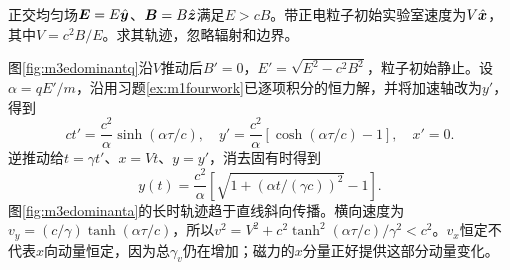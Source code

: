 \begin{exercise}\label{ex:m3electricdominant}
正交均匀场$\bm{E}=E\hat{\bm{y}}$、$\bm{B}=B\hat{\bm{z}}$满足$E>cB$。带正电粒子初始实验室速度为$V\hat{\bm{x}}$，其中$V=c^2B/E$。求其轨迹，忽略辐射和边界。
\end{exercise}
\begin{solution}
图\ref{fig:m3edominantq}沿$V$推动后$B'=0$，$E'=\sqrt{E^2-c^2B^2}$，粒子初始静止。设$\alpha=qE'/m$，沿用习题\ref{ex:m1fourwork}已逐项积分的恒力解，并将加速轴改为$y'$，得到
\[
 ct'=\frac{c^2}\alpha\sinh(\alpha\tau/c),\quad
 y'=\frac{c^2}\alpha[\cosh(\alpha\tau/c)-1],\quad x'=0.
\]
逆推动给$t=\gamma t'$、$x=Vt$、$y=y'$，消去固有时得到
\[
 y(t)=\frac{c^2}\alpha\left[\sqrt{1+(\alpha t/(\gamma c))^2}-1\right].
\]
图\ref{fig:m3edominanta}的长时轨迹趋于直线斜向传播。横向速度为$v_y=(c/\gamma)\tanh(\alpha\tau/c)$，所以$v^2=V^2+c^2\tanh^2(\alpha\tau/c)/\gamma^2<c^2$。$v_x$恒定不代表$x$向动量恒定，因为总$\gamma_v$仍在增加；磁力的$x$分量正好提供这部分动量变化。
\end{solution}

